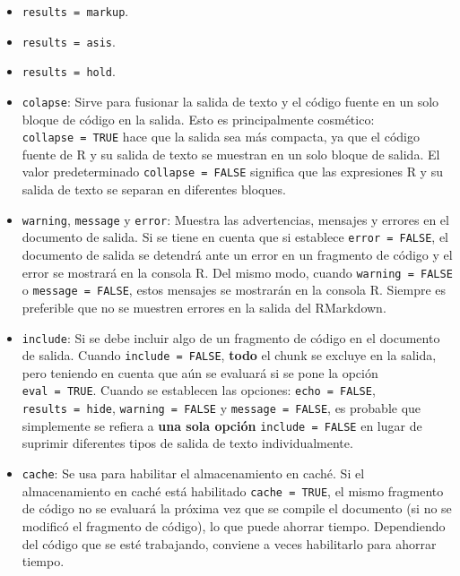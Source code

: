 \documentclass[
]{book}
\begin{document}
\begin{itemize}
\item
  \texttt{results\ =\ \textquotesingle{}markup\textquotesingle{}}.\\
\item
  \texttt{results\ =\ \textquotesingle{}asis\textquotesingle{}}.\\
\item
  \texttt{results\ =\ \textquotesingle{}hold\textquotesingle{}}.
\item
  \texttt{colapse}: Sirve para fusionar la salida de texto y el código fuente en un solo bloque de código en la salida. Esto es principalmente cosmético: \texttt{collapse\ =\ TRUE} hace que la salida sea más compacta, ya que el código fuente de R y su salida de texto se muestran en un solo bloque de salida. El valor predeterminado \texttt{collapse\ =\ FALSE} significa que las expresiones R y su salida de texto se separan en diferentes bloques.
\item
  \texttt{warning}, \texttt{message} y \texttt{error}: Muestra las advertencias, mensajes y errores en el documento de salida. Si se tiene en cuenta que si establece \texttt{error\ =\ FALSE}, el documento de salida se detendrá ante un error en un fragmento de código y el error se mostrará en la consola R. Del mismo modo, cuando \texttt{warning\ =\ FALSE} o \texttt{message\ =\ FALSE}, estos mensajes se mostrarán en la consola R. Siempre es preferible que no se muestren errores en la salida del RMarkdown.
\item
  \texttt{include}: Si se debe incluir algo de un fragmento de código en el documento de salida. Cuando \texttt{include\ =\ FALSE}, \textbf{todo} el chunk se excluye en la salida, pero teniendo en cuenta que aún se evaluará si se pone la opción \texttt{eval\ =\ TRUE}. Cuando se establecen las opciones: \texttt{echo\ =\ FALSE}, \texttt{results\ =\ \textquotesingle{}hide\textquotesingle{}}, \texttt{warning\ =\ FALSE} y \texttt{message\ =\ FALSE}, es probable que simplemente se refiera a \textbf{una sola opción} \texttt{include\ =\ FALSE} en lugar de suprimir diferentes tipos de salida de texto individualmente.
\item
  \texttt{cache}: Se usa para habilitar el almacenamiento en caché. Si el almacenamiento en caché está habilitado \texttt{cache\ =\ TRUE}, el mismo fragmento de código no se evaluará la próxima vez que se compile el documento (si no se modificó el fragmento de código), lo que puede ahorrar tiempo. Dependiendo del código que se esté trabajando, conviene a veces habilitarlo para ahorrar tiempo.

\end{itemize}
\end{document}
